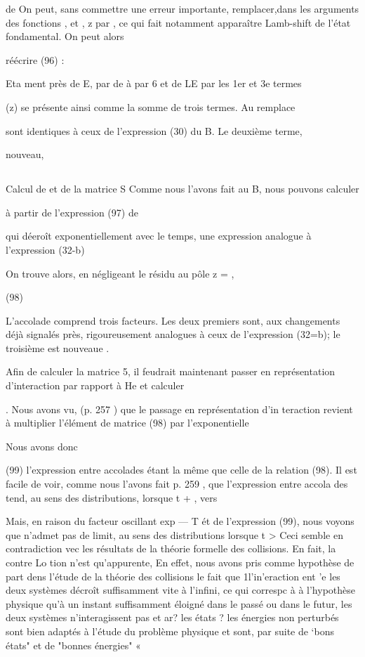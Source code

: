 de  On peut, sans commettre une erreur importante, remplacer,dans
les arguments des fonctions , et , z par , ce qui fait notamment
apparaître  Lamb-shift de l'état fondamental. On peut alors

réécrire (96) :

Eta
ment près de E, par  de à par 6 et de LE par  les 1er et 3e termes

(z) se présente ainsi comme la somme de trois termes. Au remplace

sont identiques à ceux de l'expression (30) du  B. Le deuxième terme,

nouveau,

\subsection{} Calcul de  et de la matrice S%
Comme nous l'avons fait au  B, nous pouvons calculer

à partir de l'expression (97) de

qui déeroît exponentiellement avec le temps, une expression analogue à l'expression (32-b)

On trouve alors, en négligeant le résidu au pôle z = ,


(98)

L'accolade comprend trois facteurs. Les deux premiers sont, aux changements
déjà signalés près, rigoureusement analogues à ceux de l'expression (32=b);
le troisième est nouveaue .

Afin de calculer la matrice 5, il feudrait maintenant passer en
représentation d'interaction par rapport à He et calculer

.
Nous avons vu, (p. 257 ) que le passage en représentation d'in
teraction revient à multiplier l'élément de matrice (98) par l'exponentielle

Nous avons donc



(99)
l'expression entre accolades étant la même que celle de la relation (98). Il est
facile de voir, comme nous l'avons fait p. 259 , que l'expression entre accola
des tend, au sens des distributions, lorsque t +  , vers


Mais, en raison du facteur oscillant exp — T ét de l'expression (99), nous voyons que  n'admet pas de limit,
au sens des distributions lorsque t >  Ceci semble en contradiction vec
les résultats de la théorie formelle des collisions. En fait, la contre Lo
tion n'est qu'appurente, En effet, nous avons pris comme hypothèse de  part
dens l'étude de la théorie des collisions le fait que 1l'in’eraction ent 'e
les deux systèmes décroît suffisamment vite à l'infini, ce qui correspc à à
l'hypothèse physique qu'à un instant suffisamment éloigné dans le passé ou
dans le futur, les deux systèmes n'interagissent pas et ar? les états ?
les énergies non perturbés sont bien adaptés à l'étude du problème physique
et sont, par suite de ‘bons états" et de "bonnes énergies" «

